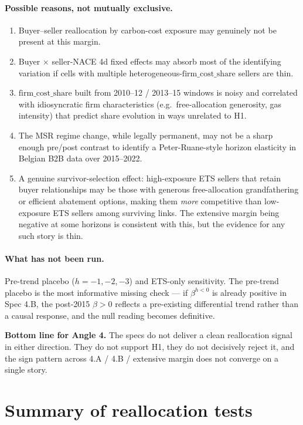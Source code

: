 \documentclass[11pt]{article}
\begin{document}
\paragraph{Possible reasons, not mutually exclusive.}
\begin{enumerate}
  \item Buyer--seller reallocation by carbon-cost exposure may genuinely not be present at this margin.
  \item Buyer $\times$ seller-NACE 4d fixed effects may absorb most of the identifying variation if cells with multiple heterogeneous-$\mathrm{firm\_cost\_share}$ sellers are thin.
  \item $\mathrm{firm\_cost\_share}$ built from 2010--12 / 2013--15 windows is noisy and correlated with idiosyncratic firm characteristics (e.g.\ free-allocation generosity, gas intensity) that predict share evolution in ways unrelated to H1.
  \item The MSR regime change, while legally permanent, may not be a sharp enough pre/post contrast to identify a Peter-Ruane-style horizon elasticity in Belgian B2B data over 2015--2022.
  \item A genuine survivor-selection effect: high-exposure ETS sellers that retain buyer relationships may be those with generous free-allocation grandfathering or efficient abatement options, making them \emph{more} competitive than low-exposure ETS sellers among surviving links. The extensive margin being negative at some horizons is consistent with this, but the evidence for any such story is thin.
\end{enumerate}

\paragraph{What has not been run.} Pre-trend placebo ($h = -1, -2, -3$) and ETS-only sensitivity. The pre-trend placebo is the most informative missing check --- if $\beta^{h<0}$ is already positive in Spec 4.B, the post-2015 $\beta>0$ reflects a pre-existing differential trend rather than a causal response, and the null reading becomes definitive.

\textbf{Bottom line for Angle 4.} The specs do not deliver a clean reallocation signal in either direction. They do not support H1, they do not decisively reject it, and the sign pattern across 4.A / 4.B / extensive margin does not converge on a single story.

\section{Summary of reallocation tests}
\end{document}
